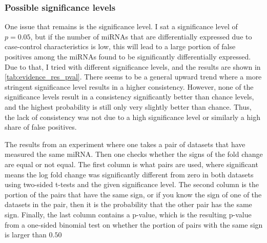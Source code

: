 {{{\subsubsection{Possible significance levels}
One issue that remains is the significance level. I sat a significance level of $p=0.05$, but if the number of miRNAs that are differentially expressed due to case-control characteristics is low, this will lead to a large portion of false positives among the miRNAs found to be significantly differentially expressed. Due to that, I tried with different significance levels, and the results are shown in \autoref{tab:evidence_res_pval}. There seems to be a general upward trend where a more stringent significance level results in a higher consistency. However, none of the significance levels result in a consistency significantly better than chance levels, and the highest probability is still only very slightly better than chance. Thus, the lack of consistency was not due to a high significance level or similarly a high share of false positives.

\begin{table}
    \caption{The results from an experiment where one takes a pair of datasets that have measured the same miRNA. Then one checks whether the signs of the fold change are equal or not equal. The first column is what pairs are used, where significant means the log fold change was significantly different from zero in both datasets using two-sided t-tests and the given significance level. The second column is the portion of the pairs that have the same sign, or if you know the sign of one of the datasets in the pair, then it is the probability that the other pair has the same sign. Finally, the last column contains a p-value, which is the resulting p-value from a one-sided binomial test on whether the portion of pairs with the same sign is larger than $0.50$}
    \label{tab:evidence_res_pval}
    \begin{center}
    \end{center}
\end{table}

}}}
